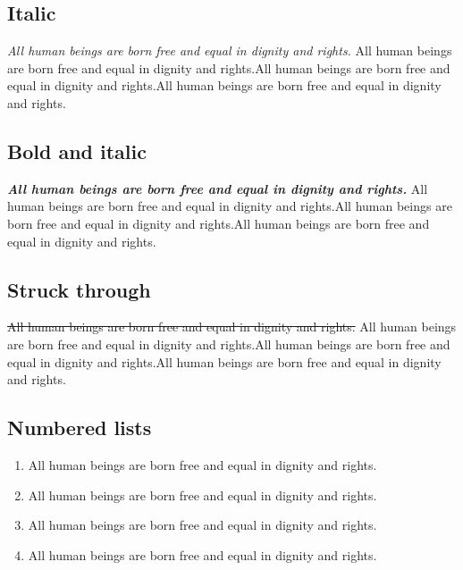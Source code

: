 \documentclass[
]{beamer}
\providecommand{\tightlist}{%
  \setlength{\itemsep}{0pt}\setlength{\parskip}{0pt}}
\begin{document}
\hypertarget{italic}{%
\subsection{Italic}\label{italic}}

\emph{All human beings are born free and equal in dignity and rights.}
All human beings are born free and equal in dignity and rights.All human
beings are born free and equal in dignity and rights.All human beings
are born free and equal in dignity and rights.

\hypertarget{bold-and-italic}{%
\subsection{Bold and italic}\label{bold-and-italic}}

\textbf{\emph{All human beings are born free and equal in dignity and
rights.}} All human beings are born free and equal in dignity and
rights.All human beings are born free and equal in dignity and
rights.All human beings are born free and equal in dignity and rights.

\hypertarget{struck-through}{%
\subsection{Struck through}\label{struck-through}}

\sout{All human beings are born free and equal in dignity and rights.}
All human beings are born free and equal in dignity and rights.All human
beings are born free and equal in dignity and rights.All human beings
are born free and equal in dignity and rights.

\hypertarget{numbered-lists}{%
\subsection{Numbered lists}\label{numbered-lists}}

\begin{enumerate}
\def\labelenumi{\arabic{enumi}.}
\tightlist
\item
  All human beings are born free and equal in dignity and rights.
\item
  All human beings are born free and equal in dignity and rights.
\item
  All human beings are born free and equal in dignity and rights.
\item
  All human beings are born free and equal in dignity and rights.
\end{enumerate}
\end{document}
